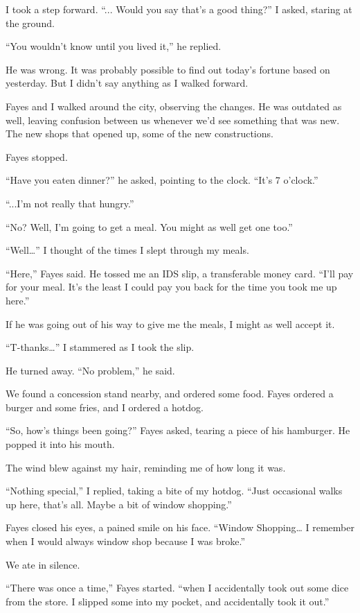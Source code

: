 I took a step forward. “... Would you say that’s a good thing?” I asked, staring at the ground.

“You wouldn’t know until you lived it,” he replied.

He was wrong. It was probably possible to find out today’s fortune based on yesterday. But I didn’t say anything as I walked forward.

Fayes and I walked around the city, observing the changes. He was outdated as well, leaving confusion between us whenever we’d see something that was new. The new shops that opened up, some of the new constructions.

Fayes stopped.

“Have you eaten dinner?” he asked, pointing to the clock. “It’s 7 o’clock.”

“...I’m not really that hungry.”

“No? Well, I’m going to get a meal. You might as well get one too.”

“Well…” I thought of the times I slept through my meals.

“Here,” Fayes said. He tossed me an IDS slip, a transferable money card. “I’ll pay for your meal. It’s the least I could pay you back for the time you took me up here.”

If he was going out of his way to give me the meals, I might as well accept it.

“T-thanks…” I stammered as I took the slip. 

He turned away. “No problem,” he said.

We found a concession stand nearby, and ordered some food. Fayes ordered a burger and some fries, and I ordered a hotdog.

“So, how’s things been going?” Fayes asked, tearing a piece of his hamburger. He popped it into his mouth.

The wind blew against my hair, reminding me of how long it was. 

“Nothing special,” I replied, taking a bite of my hotdog. “Just occasional walks up here, that’s all. Maybe a bit of window shopping.”

Fayes closed his eyes, a pained smile on his face. “Window Shopping… I remember when I would always window shop because I was broke.”

We ate in silence.

“There was once a time,” Fayes started. “when I accidentally took out some dice from the store. I slipped some into my pocket, and accidentally took it out.”

